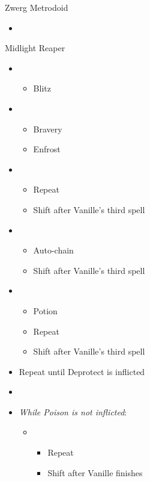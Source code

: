 \begin{multicols}{2}
\begin{battle}{Zwerg Metrodoid}
\begin{itemize}
   \item {}
\end{itemize}
\end{battle}
\begin{battle}{Midlight Reaper}
\begin{itemize}
    \item \first
    \begin{itemize}
        \item Blitz
    \end{itemize}
    \item \third
    \begin{itemize}
        \item Bravery
        \item Enfrost
    \end{itemize}
    \item \sixth
    \begin{itemize}
        \item Repeat
        \item Shift after Vanille's third spell
    \end{itemize}
    \item \fifth
    \begin{itemize}
        \item Auto-chain
        \item Shift after Vanille's third spell
    \end{itemize}
    \item \sixth
    \begin{itemize}
        \item Potion
        \item Repeat
        \item Shift after Vanille's third spell
    \end{itemize}
    \item Repeat until Deprotect is inflicted
    \item \stagger
    \item \textit{While Poison is not inflicted}:
    \begin{itemize}
        \item \first
        \begin{itemize}
            \item Repeat
            \item Shift after Vanille finishes

\end{itemize}
\end{itemize}
\end{itemize}
\end{battle}
\end{multicols}
